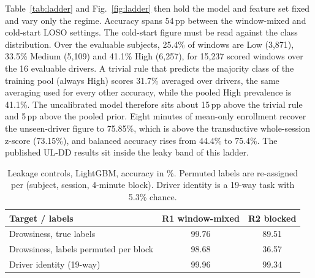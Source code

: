 \documentclass[journal]{IEEEtran}
\newcommand{\pp}{\,pp}
\newcommand{\rone}{R1}
\newcommand{\rtwo}{R2}
\begin{document}
Table~\ref{tab:ladder} and Fig.~\ref{fig:ladder} then hold the model and
feature set fixed and vary only the regime. Accuracy spans 54\pp{} between the
window-mixed and cold-start LOSO settings. The cold-start figure must be read
against the class distribution. Over the evaluable subjects, 25.4\% of
windows are Low (3{,}871), 33.5\% Medium (5{,}109) and 41.1\% High (6{,}257),
for 15{,}237 scored windows over the 16 evaluable drivers. A trivial rule that predicts the majority
class of the training pool (always High) scores 31.7\% averaged over drivers,
the same averaging used for every other accuracy, while the pooled High
prevalence is 41.1\%. The uncalibrated model therefore sits about 15\pp{}
above the trivial rule and 5\pp{} above the pooled prior. Eight minutes of mean-only enrollment recover the
unseen-driver figure to 75.85\%, which is above the transductive
whole-session z-score (73.15\%), and balanced accuracy rises from 44.4\% to
75.4\%. The published UL-DD results sit inside the leaky band of this ladder.

\begin{table}[!t]
\caption{Leakage controls, LightGBM, accuracy in \%. Permuted labels are
re-assigned per (subject, session, 4-minute block). Driver identity is a
19-way task with 5.3\% chance.}
\label{tab:controls}
\centering\footnotesize
\begin{tabular}{@{}lcc@{}}
\toprule
Target / labels & \rone{} window-mixed & \rtwo{} blocked \\
\midrule
Drowsiness, true labels            & 99.76 & 89.51 \\
Drowsiness, labels permuted per block & 98.68 & 36.57 \\
Driver identity (19-way)           & 99.96 & 99.34 \\
\bottomrule
\end{tabular}
\end{table}
\end{document}
